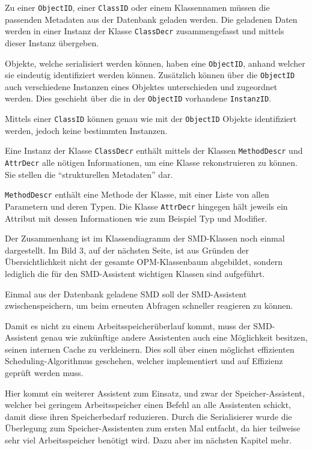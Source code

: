 Zu einer \texttt{ObjectID}, einer \texttt{ClassID} oder einem Klassennamen m\"ussen die passenden Metadaten aus der Datenbank geladen werden.
Die geladenen Daten werden in einer Instanz der Klasse \texttt{ClassDecr} zusammengefasst und mittels dieser Instanz \"ubergeben.

Objekte, welche serialisiert werden k\"onnen, haben eine \texttt{ObjectID}, anhand welcher sie eindeutig identifiziert werden k\"onnen. Zus\"atzlich k\"onnen \"uber die \texttt{ObjectID} auch verschiedene Instanzen eines Objektes unterschieden und zugeordnet werden. Dies geschieht \"uber die in der \texttt{ObjectID} vorhandene \texttt{InstanzID}.

Mittels einer \texttt{ClassID} k\"onnen genau wie mit der \texttt{ObjectID} Objekte identifiziert werden, jedoch keine bestimmten Instanzen.

Eine Instanz der Klasse \texttt{ClassDecr} enth\"alt mittels der Klassen \texttt{MethodDescr} und \texttt{AttrDecr} alle n\"otigen Informationen, um eine Klasse rekonstruieren zu k\"onnen. Sie stellen die "`strukturellen Metadaten"' dar.

\texttt{MethodDescr} enth\"alt eine Methode der Klasse, mit einer Liste von allen Parametern und deren Typen.
Die Klasse \texttt{AttrDecr} hingegen h\"alt jeweils ein Attribut mit dessen Informationen wie zum Beispiel Typ und Modifier. \cite{Zil14}

Der Zusammenhang ist im Klassendiagramm der SMD-Klassen noch einmal dargestellt. Im Bild 3, auf der n\"achsten Seite, ist aus Gr\"unden der \"Ubersichtlichkeit nicht der gesamte OPM-Klassenbaum abgebildet, sondern lediglich die f\"ur den \ac{SMD}-Assistent wichtigen Klassen sind aufgef\"uhrt.

Einmal aus der Datenbank geladene \ac{SMD} soll der SMD-Assistent zwischenspeichern, um beim erneuten Abfragen schneller reagieren zu k\"onnen. 

Damit es nicht zu einem Arbeitsspeicher\"uberlauf kommt, muss der SMD-Assistent genau wie zuk\"unftige andere Assistenten auch eine M\"oglichkeit besitzen, seinen internen Cache zu verkleinern. Dies soll \"uber einen m\"oglichst effizienten Scheduling-Algorithmus geschehen, welcher implementiert und auf Effizienz gepr\"uft werden muss.

Hier kommt ein weiterer Assistent zum Einsatz, und zwar der Speicher-Assistent, welcher bei geringem Arbeitsspeicher einen Befehl an alle Assistenten schickt, damit diese ihren Speicherbedarf reduzieren. Durch die Serialisierer wurde die \"Uberlegung zum Speicher-Assistenten zum ersten Mal entfacht, da hier teilweise sehr viel Arbeitsspeicher ben\"otigt wird. Dazu aber im n\"achsten Kapitel mehr.

